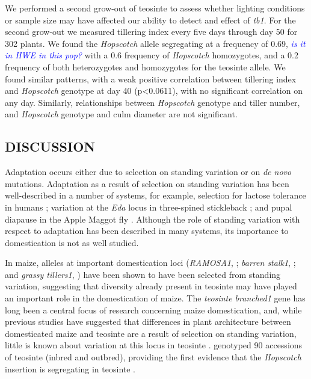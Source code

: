 \documentclass[11pt]{article}
\newcommand{\jri}[1]{\textcolor{blue}{ \emph{\scriptsize  #1}} }
\begin{document}
\begin{linenumbers}
\begin{flushleft}
We performed a second grow-out  of teosinte to assess whether lighting conditions or sample size may have affected our ability to detect and effect of \emph{tb1}.  For the second grow-out we measured tillering index every five days through day 50 for 302 plants. We found the \emph{Hopscotch} allele segregating at a frequency of 0.69, \jri{is it in HWE in this pop?} with a 0.6 frequency of \emph{Hopscotch} homozygotes, and a 0.2 frequency of both heterozygotes and homozygotes for the teosinte allele. We found similar patterns, with a weak positive correlation between tillering index and \emph{Hopscotch} genotype at day 40 (p<0.0611), with no significant correlation on any day. Similarly, relationships between \emph{Hopscotch} genotype and tiller number, and \emph{Hopscotch} genotype and culm diameter are not significant. 

\begin{centering}
\section*{DISCUSSION}
\end{centering}

Adaptation occurs either due to selection on standing variation or on \emph{de novo} mutations. Adaptation as a result of selection on standing variation has been well-described in a number of systems, for example, selection for lactose tolerance in humans \citep{Plantinga2012, Tishkoff2007}; variation at the \emph{Eda} locus in three-spined stickleback \citep{Kitano2008, Colosimo2005}; and pupal diapause in the Apple Maggot fly \citep{Feder2003}. Although the role of standing variation with respect to adaptation has been described in many systems, its importance to domestication is not as well studied. 

In maize, alleles at important domestication loci (\emph{RAMOSA1}, \citep{SigmonVollbrecht2010}; \emph{barren stalk1}, \citep{Gallavotti2004}; and \emph{grassy tillers1}, \citep{Whipple2011}) have been shown to have been selected from standing variation, suggesting that diversity already present in teosinte may have played an important role in the domestication of maize. The \emph{teosinte branched1} gene has long been a central focus of research concerning maize domestication, and, while previous studies have suggested that differences in plant architecture between domesticated maize and teosinte are a result of selection on standing variation, little is known about variation at this locus in teosinte \citep{Clark2006, Studer2011}. \citet{Studer2011} genotyped 90 accessions of teosinte (inbred and outbred), providing the first evidence that the \emph{Hopscotch} insertion is segregating in teosinte \citep{Studer2011}. 


\end{flushleft}
\end{linenumbers}
\end{document}
